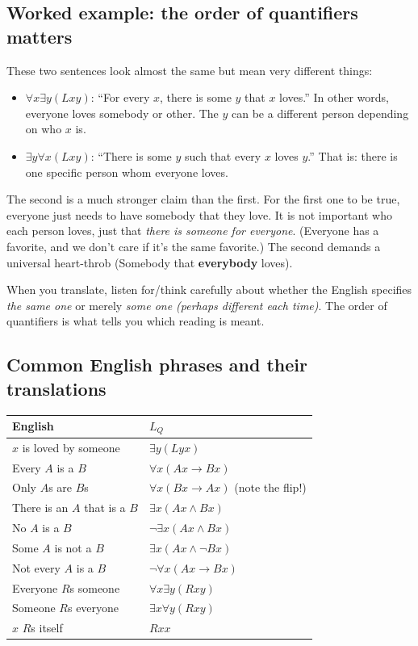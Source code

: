 \documentclass[11pt]{article}
\begin{document}
\subsection{Worked example: the order of quantifiers matters}

These two sentences look almost the same but mean very different things:

\begin{itemize}[leftmargin=*]
    \item $\forall x \exists y (Lxy)$: ``For every $x$, there is some $y$ that $x$ loves.'' In other words, everyone loves somebody or other. The $y$ can be a different person depending on who $x$ is.
    \item $\exists y \forall x (Lxy)$: ``There is some $y$ such that every $x$ loves $y$.'' That is: there is one specific person whom everyone loves.
\end{itemize}

The second is a much stronger claim than the first. For the first one to be true, everyone just needs to have somebody that they love. It is not important who each person loves, just that \textit{there is someone for everyone}. (Everyone has a favorite, and we don't care if it's the same favorite.) The second demands a universal heart-throb (Somebody that \textbf{everybody} loves).

When you translate, listen for/think carefully about whether the English specifies \emph{the same one} or merely \emph{some one (perhaps different each time)}. The order of quantifiers is what tells you which reading is meant.

\subsection{Common English phrases and their translations}

\begin{center}
\begin{tabular}{|l|l|}
\hline
\textbf{English} & \textbf{$L_Q$}\\
\hline
$x$ is loved by someone & $\exists y(Lyx)$\\
Every $A$ is a $B$ & $\forall x(Ax \to Bx)$\\
Only $A$s are $B$s & $\forall x(Bx \to Ax)$ (note the flip!)\\
There is an $A$ that is a $B$ & $\exists x(Ax \wedge Bx)$\\
No $A$ is a $B$ & $\neg \exists x(Ax \wedge Bx)$\\
Some $A$ is not a $B$ & $\exists x(Ax \wedge \neg Bx)$\\
Not every $A$ is a $B$ & $\neg \forall x(Ax \to Bx)$\\
Everyone $R$s someone & $\forall x \exists y(Rxy)$\\
Someone $R$s everyone & $\exists x \forall y(Rxy)$\\
$x$ $R$s itself & $Rxx$\\
\hline
\end{tabular}
\end{center}
\end{document}
